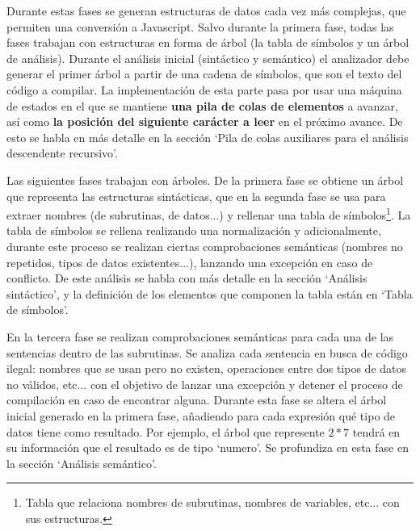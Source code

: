 \documentclass{report}
\begin{document}
	\vspace{10px}
	
	Durante estas fases se generan estructuras de datos cada vez más complejas, que permiten una conversión a Javascript. Salvo durante la primera fase, todas las fases trabajan con estructuras en forma de árbol (la tabla de símbolos y un árbol de análisis). Durante el análisis inicial (sintáctico y semántico) el analizador debe generar el primer árbol a partir de una cadena de símbolos, que son el texto del código a compilar. La implementación de esta parte pasa por usar una máquina de estados en el que se mantiene \textbf{una pila de colas de elementos} a avanzar, así como \textbf{la posición del siguiente carácter a leer} en el próximo avance. De esto se habla en más detalle en la sección `Pila de colas auxiliares para el análisis descendente recursivo'. 
	
	\vspace{10px}
	
	Las siguientes fases trabajan con árboles. De la primera fase se obtiene un árbol que representa las estructuras sintácticas, que en la segunda fase se usa para extraer nombres (de subrutinas, de datos...) y rellenar una tabla de símbolos\footnote{Tabla que relaciona nombres de subrutinas, nombres de variables, etc... con sus estructuras.}. La tabla de símbolos se rellena realizando una normalización y adicionalmente, durante este proceso se realizan ciertas comprobaciones semánticas (nombres no repetidos, tipos de datos existentes...), lanzando una excepción en caso de conflicto. De este análisis se habla con más detalle en la sección `Análisis sintáctico', y la definición de los elementos que componen la tabla están en `Tabla de símbolos'.
	
	\vspace{10px}
	
	En la tercera fase se realizan comprobaciones semánticas para cada una de las sentencias dentro de las subrutinas. Se analiza cada sentencia en busca de código ilegal: nombres que se usan pero no existen, operaciones entre dos tipos de datos no válidos, etc... con el objetivo de lanzar una excepción y detener el proceso de compilación en caso de encontrar alguna. Durante esta fase se altera el árbol inicial generado en la primera fase, añadiendo para cada expresión qué tipo de datos tiene como resultado. Por ejemplo, el árbol que represente $2 * 7$ tendrá en su información que el resultado es de tipo `numero'.  Se profundiza en esta fase en la sección `Análisis semántico'.
	
\end{document}

